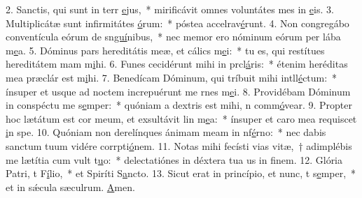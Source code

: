2. Sanctis, qui sunt in terr \uline{e}jus,~* mirificávit omnes voluntátes mes in \uline{e}is.
3. Multiplicátæ sunt infirmitátes \uline{ó}rum:~* póstea accelrav\uline{é}runt.
4. Non congregábo conventícula eórum de sn\uline{guí}nibus,~* nec memor ero nóminum eórum per lába m\uline{e}a.
5. Dóminus pars hereditátis meæ, et cálics m\uline{e}i:~* tu es, qui restítues hereditátem mam m\uline{i}hi.
6. Funes cecidérunt mihi in prcl\uline{á}ris:~* étenim heréditas mea præclár est m\uline{i}hi.
7. Benedícam Dóminum, qui tríbuit mihi intll\uline{é}ctum:~* ínsuper et usque ad noctem increpuérunt me rnes m\uline{e}i.
8. Providébam Dóminum in conspéctu me s\uline{e}mper:~* quóniam a dextris est mihi, n comm\uline{ó}vear.
9. Propter hoc lætátum est cor meum, et exsultávit lin m\uline{e}a:~* ínsuper et caro mea requiscet \uline{i}n spe.
10. Quóniam non derelínques ánimam meam in nf\uline{é}rno:~* nec dabis sanctum tuum vidére corrpti\uline{ó}nem.
11. Notas mihi fecísti vias vitæ,~† adimplébis me lætítia cum vult t\uline{u}o:~* delectatiónes in déxtera tua us in f\uline{i}nem.
12. Glória Patri, t F\uline{í}lio,~* et Spiríti S\uline{a}ncto.
13. Sicut erat in princípio, et nunc, t s\uline{e}mper,~* et in sǽcula sæculrum. \uline{A}men.
